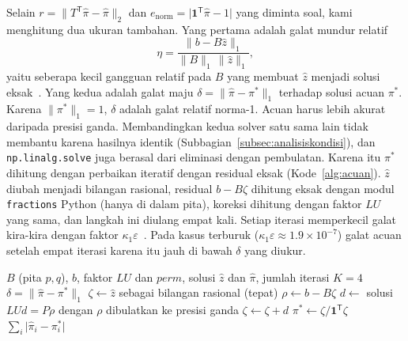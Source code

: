 \documentclass[12pt,a4paper]{article}
\newcommand{\T}{\mathsf{T}}
\numberwithin{equation}{section}
\begin{document}
Selain $r=\lVert T^\T\hat\pi-\hat\pi\rVert_2$ dan $e_{\mathrm{norm}}=\lvert\mathbf1^\T\hat\pi-1\rvert$ yang diminta
soal, kami menghitung dua ukuran tambahan. Yang pertama adalah galat mundur relatif
\begin{equation}\label{eq:eta}
\eta=\frac{\lVert b-B\hat z\rVert_1}{\lVert B\rVert_1\,\lVert\hat z\rVert_1},
\end{equation}
yaitu seberapa kecil gangguan relatif pada $B$ yang membuat $\hat z$ menjadi solusi eksak~\cite{higham}. Yang kedua
adalah galat maju $\delta=\lVert\hat\pi-\pi^\ast\rVert_1$ terhadap solusi acuan $\pi^\ast$. Karena
$\lVert\pi^\ast\rVert_1=1$, $\delta$ adalah galat relatif norma-1. Acuan harus lebih akurat daripada presisi ganda.
Membandingkan kedua solver satu sama lain tidak membantu karena hasilnya identik (Subbagian~\ref{subsec:analisiskondisi}),
dan \texttt{np.linalg.solve} juga berasal dari eliminasi dengan pembulatan. Karena itu $\pi^\ast$ dihitung dengan
perbaikan iteratif dengan residual eksak (Kode~\ref{alg:acuan}). $\hat z$ diubah menjadi bilangan rasional, residual
$b-B\zeta$ dihitung eksak dengan modul \texttt{fractions} Python (hanya di dalam pita), koreksi dihitung dengan faktor
$LU$ yang sama, dan langkah ini diulang empat kali. Setiap iterasi memperkecil galat kira-kira dengan faktor
$\kappa_1\varepsilon$~\cite{higham}. Pada kasus terburuk ($\kappa_1\varepsilon\approx1.9\times10^{-7}$) galat acuan
setelah empat iterasi karena itu jauh di bawah $\delta$ yang diukur.

\begin{algorithm}[H]
\caption{Solusi acuan $\pi^\ast$ dan galat maju $\delta$ dengan perbaikan iteratif dan residual eksak}
\label{alg:acuan}
\begin{algorithmic}[1]
\Require $B$ (pita $p,q$), $b$, faktor $LU$ dan $\mathit{perm}$, solusi $\hat z$ dan $\hat\pi$, jumlah iterasi $K=4$
\Ensure $\delta=\lVert\hat\pi-\pi^\ast\rVert_1$
\State $\zeta\gets\hat z$ sebagai bilangan rasional (tepat)
  \State $\rho\gets b-B\zeta$ 
  \State $d\gets$ solusi $LUd=P\rho$ dengan $\rho$ dibulatkan ke presisi ganda 
  \State $\zeta\gets\zeta+d$ 
\EndFor
\State $\pi^\ast\gets\zeta/\mathbf1^\T\zeta$ 
\State \Return $\sum_i\lvert\hat\pi_i-\pi^\ast_i\rvert$ 
\end{algorithmic}
\end{algorithm}
\end{document}
